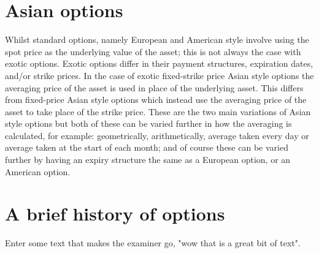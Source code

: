 \section{Asian options}

Whilst standard options, namely European and American style involve using the spot price as the underlying value of the asset; this is not always the case with exotic options. Exotic options differ in their payment structures, expiration dates, and/or strike prices. In the case of exotic fixed-strike price Asian style options the averaging price of the asset is used in place of the underlying asset. This differs from fixed-price Asian style options which instead use the averaging price of the asset to take place of the strike price. These are the two main variations of Asian style options but both of these can be varied further in how the averaging is calculated, for example: geometrically, arithmetically, average taken every day or average taken at the start of each month; and of course these can be varied further by having an expiry structure the same as a European option, or an American option.

\section{A brief history of options}


Enter some text that makes the examiner go, "wow that is a great bit of text". 

